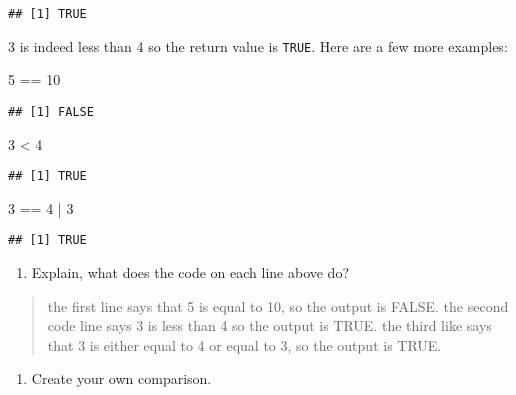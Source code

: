 \documentclass[
]{article}
\newenvironment{Shaded}{\begin{snugshade}}{\end{snugshade}}
\newcommand{\DecValTok}[1]{\textcolor[rgb]{0.00,0.00,0.81}{#1}}
\newcommand{\SpecialCharTok}[1]{\textcolor[rgb]{0.00,0.00,0.00}{#1}}
\providecommand{\tightlist}{%
  \setlength{\itemsep}{0pt}\setlength{\parskip}{0pt}}
\begin{document}
\begin{verbatim}
## [1] TRUE
\end{verbatim}

3 is indeed less than 4 so the return value is \texttt{TRUE}. Here are a
few more examples:

\begin{Shaded}
\begin{Highlighting}[]
\DecValTok{5} \SpecialCharTok{==} \DecValTok{10}
\end{Highlighting}
\end{Shaded}

\begin{verbatim}
## [1] FALSE
\end{verbatim}

\begin{Shaded}
\begin{Highlighting}[]
\DecValTok{3} \SpecialCharTok{\textless{}} \DecValTok{4}
\end{Highlighting}
\end{Shaded}

\begin{verbatim}
## [1] TRUE
\end{verbatim}

\begin{Shaded}
\begin{Highlighting}[]
\DecValTok{3} \SpecialCharTok{==} \DecValTok{4} \SpecialCharTok{|} \DecValTok{3}
\end{Highlighting}
\end{Shaded}

\begin{verbatim}
## [1] TRUE
\end{verbatim}

\begin{enumerate}
\def\labelenumi{(\arabic{enumi})}
\setcounter{enumi}{5}
\tightlist
\item
  Explain, what does the code on each line above do?
\end{enumerate}

\begin{quote}
the first line says that 5 is equal to 10, so the output is FALSE. the
second code line says 3 is less than 4 so the output is TRUE. the third
like says that 3 is either equal to 4 or equal to 3, so the output is
TRUE.
\end{quote}

\begin{enumerate}
\def\labelenumi{(\arabic{enumi})}
\setcounter{enumi}{6}
\tightlist
\item
  Create your own comparison.
\end{enumerate}
\end{document}
